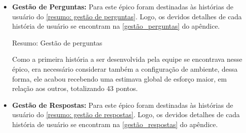 \begin{itemize}
\item {\textbf{Gestão de Perguntas:}} Para este épico foram destinadas às histórias de usuário do \autoref{resumo: gestão de perguntas}. Logo, os devidos detalhes de cada história de usuário se encontram na \autoref{gestão_perguntas} do apêndice.

\def\arraystretch{2}
\begin{quadro}[htb]
\centering
\ABNTEXfontereduzida
\caption{Resumo: Gestão de perguntas}
\label{resumo: gestão de perguntas}
\end{quadro}
\FloatBarrier 

Como a primeira história a ser desenvolvida pela equipe se encontrava nesse épico, era necessário considerar também a configuração de ambiente, dessa forma, ele acabou recebendo uma estimava global de esforço maior, em relação aos outros, totalizando 43 pontos.

\item {\textbf{Gestão de Respostas:}} Para este épico foram destinadas às histórias de usuário do \autoref{resumo: gestão de respostas}. Logo, os devidos detalhes de cada história de usuário se encontram na \autoref{gestão_respostas} do apêndice.


\end{itemize}
